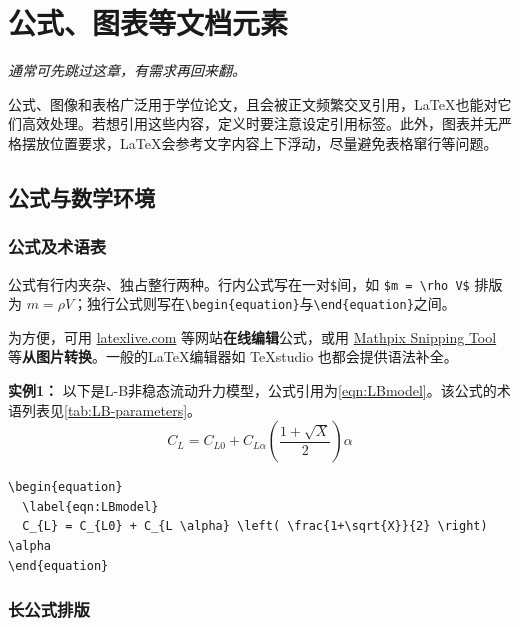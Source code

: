 \chapter{公式、图表等文档元素}
\label{chap:example}

\textit{
通常可先跳过这章，有需求再回来翻。
}

公式、图像和表格广泛用于学位论文，且会被正文频繁交叉引用，\LaTeX{}也能对它们高效处理。若想引用这些内容，定义时要注意设定引用标签。此外，图表并无严格摆放位置要求，\LaTeX{}会参考文字内容上下浮动，尽量避免表格窜行等问题。

\section{公式与数学环境}

\subsection{公式及术语表}
\label{sec:eqn}

公式有行内夹杂、独占整行两种。行内公式写在一对\verb|$|间，如 \verb|$m = \rho V$| 排版为 $m = \rho V$；独行公式则写在\verb|\begin{equation}|与\verb|\end{equation}|之间。

为方便，可用 \href{https://www.latexlive.com/}{latexlive.com} 等网站\textbf{在线编辑}公式，或用 \href{https://mathpix.com/snipping-tool}{Mathpix Snipping Tool} 等\textbf{从图片转换}。一般的\LaTeX{}编辑器如 TeXstudio 也都会提供语法补全。

{\bf{实例1：}} 以下是L-B非稳态流动升力模型，公式引用为\cref{eqn:LBmodel}。该公式的术语列表见\cref{tab:LB-parameters}。
\begin{equation}
  \label{eqn:LBmodel}
  C_{L} = C_{L0} + C_{L \alpha} \left( \frac{1+\sqrt{X}}{2} \right) \alpha
\end{equation}

\begin{lstlisting}[language={[LaTeX]TeX}, caption={L-B非稳态流动升力模型}]
\begin{equation}
  \label{eqn:LBmodel}
  C_{L} = C_{L0} + C_{L \alpha} \left( \frac{1+\sqrt{X}}{2} \right) \alpha
\end{equation}
\end{lstlisting}

\clearpage
\subsection{长公式排版}


